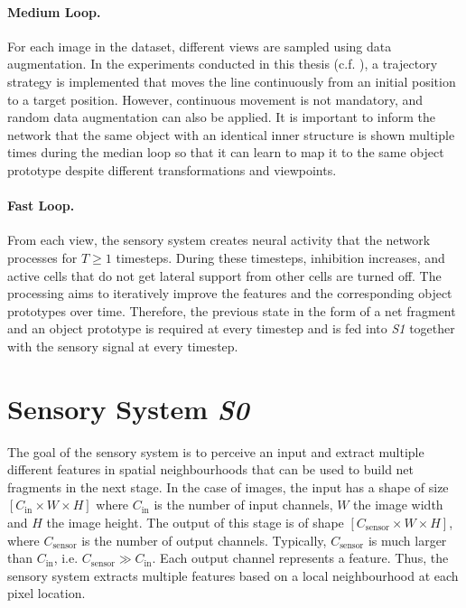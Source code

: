 \paragraph{Medium Loop.} For each image in the dataset, different views are sampled using data augmentation. In the experiments conducted in this thesis (c.f. ), a trajectory strategy is implemented that moves the line continuously from an initial position to a target position.
However, continuous movement is not mandatory, and random data augmentation can also be applied. It is important to inform the network that the same object with an identical inner structure is shown multiple times during the median loop so that it can learn to map it to the same object prototype despite different transformations and viewpoints.

\paragraph{Fast Loop.} From each view, the sensory system creates neural activity that the network processes for $T \geq 1$ timesteps. During these timesteps, inhibition increases, and active cells that do not get lateral support from other cells are turned off. 
The processing aims to iteratively improve the features and the corresponding object prototypes over time. Therefore, the previous state in the form of a net fragment and an object prototype is required at every timestep and is fed into \emph{S1} together with the sensory signal at every timestep.


\section{Sensory System \emph{S0}}
The goal of the sensory system is to perceive an input and extract multiple different features in spatial neighbourhoods that can be used to build net fragments  in the next stage.
In the case of images, the input has a shape of size $[C_{\text{in}} \times W \times H]$ where $C_{\text{in}}$ is the number of input channels, $W$ the image width and $H$ the image height.
The output of this stage is of shape $[C_{\text{sensor}} \times W \times H]$, where $C_{\text{sensor}}$ is the number of output channels. Typically, $C_{\text{sensor}}$ is much larger than $C_{\text{in}}$, i.e. $C_{\text{sensor}} \gg C_{\text{in}}$.
Each output channel represents a feature. Thus, the sensory system extracts multiple features based on a local neighbourhood at each pixel location.


